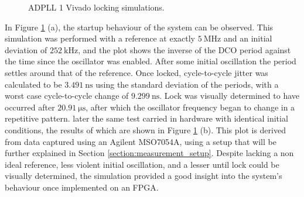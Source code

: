 \begin{figure}[h]
    \centering
    \caption[\ac{ADPLL} 1 Vivado locking simulations]{\ac{ADPLL} 1 Vivado locking simulations.}
    \label{fig:sim_locking}
\end{figure}
In Figure \ref{fig:sim_locking} (a), the startup behaviour of the system can be observed. This simulation was performed with a reference at exactly $5~\si{\mega\hertz}$ and an initial deviation of $252~\si{\kilo\hertz}$, and the plot shows the inverse of the \ac{DCO} period against the time since the oscillator was enabled. After some initial oscillation the period settles around that of the reference. Once locked, cycle-to-cycle jitter was calculated to be $3.491~\si{\nano\second}$ using the standard deviation of the periods, with a worst case cycle-to-cycle change of $9.299~\si{\nano\second}$. Lock was visually determined to have occurred after $20.91~\si{\micro\second}$, after which the oscillator frequency began to change in a repetitive pattern. later the same test carried in hardware with identical initial conditions, the results of which are shown in Figure \ref{fig:sim_locking} (b). This plot is derived from data captured using an Agilent MSO7054A, using a setup that will be further explained in Section \ref{section:measurement_setup}. Despite lacking a non ideal reference, less violent initial oscillation, and a lesser until lock could be visually determined, the simulation provided a good insight into the system's behaviour once implemented on an \ac{FPGA}.



